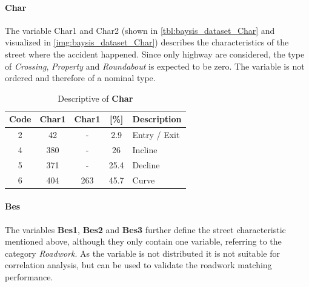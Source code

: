 \paragraph{Char}
\label{baysis_dataset_Char}
The variable Char1 and Char2 (shown in \autoref{tbl:baysis_dataset_Char} and visualized in \ref{img:baysis_dataset_Char}) describes the characteristics of the street where the accident happened. Since only highway are considered, the type of \textit{Crossing}, \textit{Property} and \textit{Roundabout} is expected to be zero. The variable is not ordered and therefore of a nominal type.  
\begin{table}[ht]
	\centering
	\small
	\begin{tabular}{c|c|c|c|l}
		\toprule
		Code & \textbf{Char1} & \textbf{Char1} & [\%] & Description \\ 
		\midrule
	    2 & 42	& -		& 2.9	& Entry / Exit \\
	    4 & 380	& -		& 26	& Incline \\
	    5 & 371	& -		& 25.4	& Decline \\
	    6 & 404	& 263	& 45.7	& Curve \\
		\bottomrule
	\end{tabular}
	\caption{Descriptive of \textbf{Char}}
	\label{tbl:baysis_dataset_Char}
	\vspace{-8mm}
\end{table}
\paragraph{Bes}
\label{baysis_dataset_Bes}
The variables \textbf{Bes1}, \textbf{Bes2} and \textbf{Bes3} further define the street characteristic mentioned above, although they only contain one variable, referring to the category \textit{Roadwork}. As the variable is not distributed it is not suitable for correlation analysis, but can be used to validate the roadwork matching performance.
